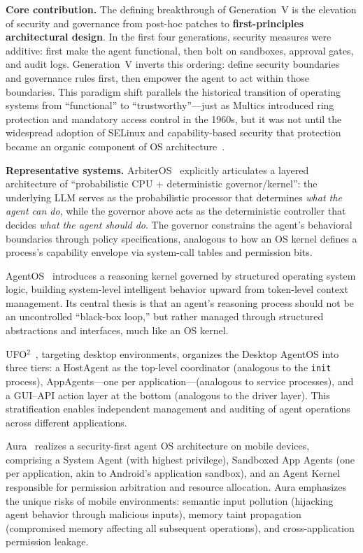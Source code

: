 \documentclass[11pt,a4paper]{article}
\begin{document}
\textbf{Core contribution.}
The defining breakthrough of Generation~V is the elevation of security and governance from post-hoc patches to \textbf{first-principles architectural design}.
In the first four generations, security measures were additive: first make the agent functional, then bolt on sandboxes, approval gates, and audit logs.
Generation~V inverts this ordering: define security boundaries and governance rules first, then empower the agent to act within those boundaries.
This paradigm shift parallels the historical transition of operating systems from ``functional'' to ``trustworthy''---just as Multics introduced ring protection and mandatory access control in the 1960s, but it was not until the widespread adoption of SELinux and capability-based security that protection became an organic component of OS architecture~\cite{ostep_2023}.

\textbf{Representative systems.}
ArbiterOS~\cite{arbiteros2025} explicitly articulates a layered architecture of ``probabilistic CPU + deterministic governor/kernel'': the underlying LLM serves as the probabilistic processor that determines \textit{what the agent can do}, while the governor above acts as the deterministic controller that decides \textit{what the agent should do}.
The governor constrains the agent's behavioral boundaries through policy specifications, analogous to how an OS kernel defines a process's capability envelope via system-call tables and permission bits.

AgentOS~\cite{agentos2025} introduces a reasoning kernel governed by structured operating system logic, building system-level intelligent behavior upward from token-level context management.
Its central thesis is that an agent's reasoning process should not be an uncontrolled ``black-box loop,'' but rather managed through structured abstractions and interfaces, much like an OS kernel.

UFO$^2$~\cite{ufo2_2025}, targeting desktop environments, organizes the Desktop AgentOS into three tiers: a HostAgent as the top-level coordinator (analogous to the \texttt{init} process), AppAgents---one per application---(analogous to service processes), and a GUI--API action layer at the bottom (analogous to the driver layer).
This stratification enables independent management and auditing of agent operations across different applications.

Aura~\cite{aura2025} realizes a security-first agent OS architecture on mobile devices, comprising a System Agent (with highest privilege), Sandboxed App Agents (one per application, akin to Android's application sandbox), and an Agent Kernel responsible for permission arbitration and resource allocation.
Aura emphasizes the unique risks of mobile environments: semantic input pollution (hijacking agent behavior through malicious inputs), memory taint propagation (compromised memory affecting all subsequent operations), and cross-application permission leakage.
\end{document}
